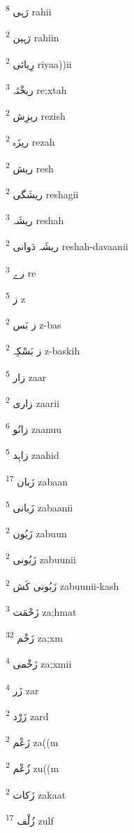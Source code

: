 \documentclass[12pt]{article}
\begin{document}
\begin{RTL}
\begin{multicols}{5}
{\ur رَہی}   \textsuperscript{8} rahii

{\ur رَہِین}   \textsuperscript{2} rahiin

{\ur رِیائی}   \textsuperscript{2} riyaa))ii

{\ur ریخْتَہ}   \textsuperscript{3} re;xtah

{\ur ریزِش}   \textsuperscript{2} rezish

{\ur ریزَہ}   \textsuperscript{2} rezah

{\ur ریش}   \textsuperscript{2} resh

{\ur ریشَگی}   \textsuperscript{2} reshagii

{\ur ریشَہ}   \textsuperscript{3} reshah

{\ur ریشَہ دَوانی}   \textsuperscript{2} reshah-davaanii

{\ur رے}   \textsuperscript{3} re

{\ur ز}   \textsuperscript{5} z

{\ur ز بَس}   \textsuperscript{2} z-bas

{\ur ز بَسْکِہ}   \textsuperscript{2} z-baskih

{\ur زار}   \textsuperscript{5} zaar

{\ur زاری}   \textsuperscript{2} zaarii

{\ur زانُو}   \textsuperscript{6} zaanuu

{\ur زاہِد}   \textsuperscript{5} zaahid

{\ur زَبان}   \textsuperscript{17} zabaan

{\ur زَبانی}   \textsuperscript{5} zabaanii

{\ur زَبُون}   \textsuperscript{2} zabuun

{\ur زَبُونی}   \textsuperscript{2} zabuunii

{\ur زَبُونی کَش}   \textsuperscript{2} zabuunii-kash

{\ur زَحْمَت}   \textsuperscript{3} za;hmat

{\ur زَخْم}   \textsuperscript{32} za;xm

{\ur زَخْمی}   \textsuperscript{4} za;xmii

{\ur زَر}   \textsuperscript{4} zar

{\ur زَرْد}   \textsuperscript{2} zard

{\ur زَعْم}   \textsuperscript{2} za((m

{\ur زُعْم}   \textsuperscript{2} zu((m

{\ur زَکات}   \textsuperscript{2} zakaat

{\ur زُلْف}   \textsuperscript{17} zulf


\end{multicols}
\end{RTL}
\end{document}
